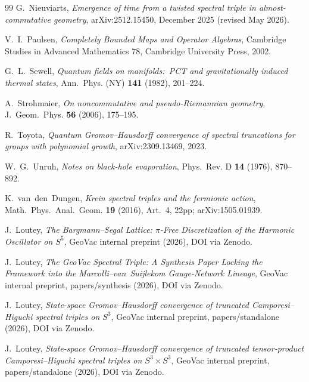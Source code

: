 \documentclass[11pt,a4paper]{article}
\theoremstyle{plain}
\theoremstyle{definition}
\newcommand{\sthree}{S^{3}}
\begin{document}
\begin{thebibliography}{99}
G.~Nieuviarts,
\newblock \emph{Emergence of time from a twisted spectral triple
in almost-commutative geometry},
\newblock arXiv:2512.15450, December 2025 (revised May 2026).

V.~I.~Paulsen,
\newblock \emph{Completely Bounded Maps and Operator Algebras},
\newblock Cambridge Studies in Advanced Mathematics 78,
Cambridge University Press, 2002.

G.~L.~Sewell,
\newblock \emph{Quantum fields on manifolds:\ PCT and gravitationally
induced thermal states},
\newblock Ann.~Phys. (NY) \textbf{141} (1982), 201--224.

A.~Strohmaier,
\newblock \emph{On noncommutative and pseudo-Riemannian geometry},
\newblock J.~Geom.~Phys. \textbf{56} (2006), 175--195.

R.~Toyota,
\newblock \emph{Quantum Gromov--Hausdorff convergence of spectral
truncations for groups with polynomial growth},
\newblock arXiv:2309.13469, 2023.

W.~G.~Unruh,
\newblock \emph{Notes on black-hole evaporation},
\newblock Phys.~Rev. D \textbf{14} (1976), 870--892.

K.~van~den~Dungen,
\newblock \emph{Krein spectral triples and the fermionic action},
\newblock Math.~Phys.~Anal.~Geom. \textbf{19} (2016), Art.~4, 22pp;
\newblock arXiv:1505.01939.

J.~Loutey,
\newblock \emph{The Bargmann--Segal Lattice: $\pi$-Free Discretization
of the Harmonic Oscillator on $S^5$},
\newblock GeoVac internal preprint (2026), DOI via Zenodo.

J.~Loutey,
\newblock \emph{The GeoVac Spectral Triple: A Synthesis Paper Locking
the Framework into the Marcolli--van~Suijlekom Gauge-Network Lineage},
\newblock GeoVac internal preprint, papers/synthesis (2026),
DOI via Zenodo.

J.~Loutey,
\newblock \emph{State-space Gromov--Hausdorff convergence of
truncated Camporesi--Higuchi spectral triples on $S^3$},
\newblock GeoVac internal preprint, papers/standalone (2026),
DOI via Zenodo.

J.~Loutey,
\newblock \emph{State-space Gromov--Hausdorff convergence of truncated
tensor-product Camporesi--Higuchi spectral triples on $\sthree \times \sthree$},
\newblock GeoVac internal preprint, papers/standalone (2026),
DOI via Zenodo.


\end{thebibliography}
\end{document}
